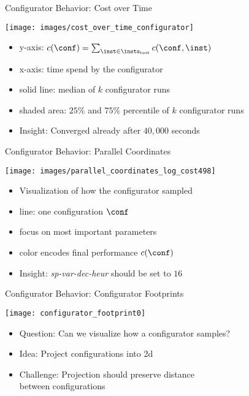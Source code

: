 \begin{frame}[c]{Configurator Behavior: Cost over Time}

\centering
\texttt{[image: images/cost\_over\_time\_configurator]}

\begin{itemize}
  \item y-axis: $c(\conf) = \sum_{\inst \in \insts_{\text{test}}} c(\conf,\inst)$
  \item x-axis: time spend by the configurator
  \item solid line: median of $k$ configurator runs
  \item shaded area: $25\%$ and $75\%$ percentile of $k$ configurator runs
  \item \alert{Insight:} Converged already after $40,000$ seconds 
\end{itemize}

\end{frame}
\begin{frame}[c]{Configurator Behavior: Parallel Coordinates}

\centering
\texttt{[image: images/parallel\_coordinates\_log\_cost498]}

\begin{itemize}
  \item Visualization of how the configurator sampled
  \item line: one configuration $\conf$
  \item focus on most important parameters
  \item color encodes final performance $c(\conf)$
  \item \alert{Insight:} \textit{sp-var-dec-heur} should be set to $16$
\end{itemize}

\end{frame}
\begin{frame}[c]{Configurator Behavior: Configurator Footprints}

\centering
\texttt{[image: configurator\_footprint0]}

\begin{itemize}
  \item Question: Can we visualize how a configurator samples?
  \pause
  \item Idea: Project configurations into 2d
  \pause
  \item Challenge: Projection should preserve distance\\ between configurations
\end{itemize}

\end{frame}
